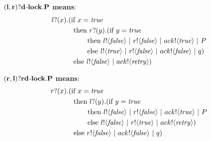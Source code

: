 \documentclass[12pt,twoside]{reedthesis}
\begin{document}
		\begin{table}[ht]
		\hspace{-2.5cm}	
		\begin{minipage}[b]{.5\textwidth}
		\centering $\mathbf{(l,r)?d\mbox{\emph{-}}lock.P}$ \textbf{means}:
		\begin{equation*}\begin{split}
			\receive{l}{x}(&\pif{x=\ptrue}\\
			&\pthen \receive{r}{y} (\pif {y=\ptrue}\\
			&\ \ \ \ \ \ \pthen \send{l}{\pfalse} \comp \send{r}{\pfalse} \comp \send{ack}{\ptrue} \comp P\\
			&\ \ \ \ \ \ \pelse \send{l}{\ptrue} \comp \send{r}{\pfalse} \comp \send{ack}{\pfalse} \comp q)\\
			&\pelse\send{l}{\pfalse} \comp \send{ack}{\pretry})\\
		\end{split}\end{equation*}
	\end{minipage}
	\hspace{2.5cm}
	\begin{minipage}[b]{.5\textwidth}	
		\centering $\mathbf{(r,l)?rd\mbox{\emph{-}}lock.P}$ \textbf{means}:
		\begin{equation*}\begin{split}
			\receive{r}{x}(&\pif{x=\ptrue}\\
			&\pthen \receive{l}{y} (\pif {y=\ptrue}\\
			&\ \ \ \ \ \ \pthen \send{l}{\pfalse} \comp \send{r}{\pfalse} \comp \send{ack}{\ptrue} \comp P\\
			&\ \ \ \ \ \ \pelse \send{l}{\pfalse} \comp \send{r}{\ptrue} \comp \send{ack}{\pretry})\\
			&\pelse\send{r}{\pfalse} \comp \send{ack}{\pfalse}\comp q)\\
		\end{split}\end{equation*}
	\end{minipage}
	\end{table}
\end{document}
